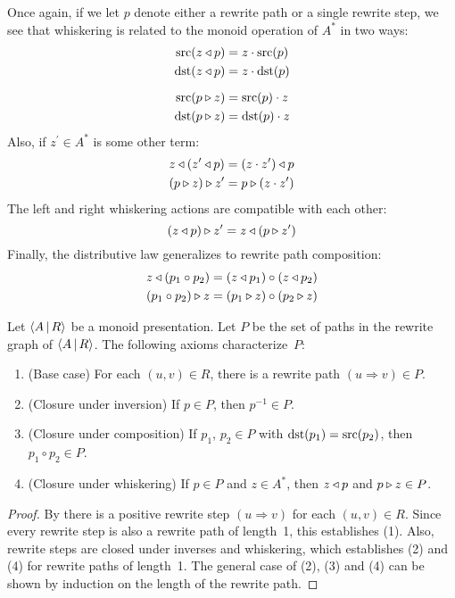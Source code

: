 \documentclass[../generics]{subfiles}
\begin{document}
\begin{definition}
Once again, if we let $p$ denote either a rewrite path or a single rewrite step, we see that whiskering is related to the monoid operation of $A^*$ in two ways:
\begin{gather*}
\operatorname{src}(z\triangleleft p)=z\cdot \operatorname{src}(p)\\
\operatorname{dst}(z\triangleleft p)=z\cdot \operatorname{dst}(p)\\[\medskipamount]
\operatorname{src}(p\triangleright z)=\operatorname{src}(p)\cdot z\\
\operatorname{dst}(p\triangleright z)=\operatorname{dst}(p)\cdot z
\end{gather*}
Also, if $z^\prime\in A^*$ is some other term:
\begin{gather*}
z\triangleleft (z^\prime \triangleleft p)=(z\cdot z^\prime) \triangleleft p\\
(p\triangleright z)\triangleright z^\prime=p\triangleright (z\cdot z^\prime)
\end{gather*}
The left and right whiskering actions are compatible with each other:
\[(z\triangleleft p)\triangleright z^\prime = z\triangleleft(p\triangleright z^\prime)\]
Finally, the distributive law generalizes to rewrite path composition:
\begin{gather*}
z\triangleleft (p_1 \circ p_2) = (z\triangleleft p_1) \circ (z\triangleleft p_2)\\
(p_1 \circ p_2)\triangleright z = (p_1\triangleright z) \circ (p_2\triangleright z)
\end{gather*}
\end{definition}

\begin{proposition}
Let $\langle A\,|\,R\rangle$ be a monoid presentation. Let $P$ be the set of paths in the rewrite graph of $\langle A\,|\,R\rangle$. The following axioms characterize~$P$:
\begin{enumerate}
\item (Base case) For each $(u,v)\in R$, there is a rewrite path $(u\Rightarrow v)\in P$.
\item (Closure under inversion) If $p\in P$, then $p^{-1}\in P$.
\item (Closure under composition) If $p_1$, $p_2\in P$ with $\operatorname{dst}(p_1)=\operatorname{src}(p_2)$, then $p_1\circ p_2\in P$.
\item (Closure under whiskering) If $p\in P$ and $z\in A^*$, then $z\triangleleft p$ and $p\triangleright z\in P$.
\end{enumerate}
\end{proposition}
\begin{proof}
By  there is a positive rewrite step $(u\Rightarrow v)$ for each $(u,v)\in R$. Since every rewrite step is also a rewrite path of length~1, this establishes (1). Also, rewrite steps are closed under inverses and whiskering, which establishes (2) and (4) for rewrite paths of length~1. The general case of (2), (3) and (4) can be shown by induction on the length of the rewrite path.
\end{proof}
\end{document}
